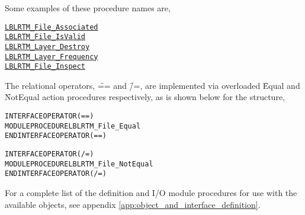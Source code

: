 Some examples of these procedure names are,

\begin{alltt}
  \hyperref[sec:LBLRTM_File_Associated_interface]{LBLRTM_File_Associated}
  \hyperref[sec:LBLRTM_File_IsValid_interface]{LBLRTM_File_IsValid}
  \hyperref[sec:LBLRTM_Layer_Destroy_interface]{LBLRTM_Layer_Destroy}
  \hyperref[sec:LBLRTM_Layer_Frequency_interface]{LBLRTM_Layer_Frequency}
  \hyperref[sec:LBLRTM_File_Inspect_interface]{LBLRTM_File_Inspect}\end{alltt}

The relational operators, \f{==} and \f{/=}, are implemented via overloaded \f{Equal} and \f{NotEqual} action procedures respectively, as is shown below for the \File{} structure,

\begin{alltt}
  INTERFACE OPERATOR(==)
    MODULE PROCEDURE LBLRTM_File_Equal
  END INTERFACE OPERATOR(==)

  INTERFACE OPERATOR(/=)
    MODULE PROCEDURE LBLRTM_File_NotEqual
  END INTERFACE OPERATOR(/=)\end{alltt}

For a complete list of the definition and I/O module procedures for use with the available objects, see appendix \ref{app:object_and_interface_definition}.

